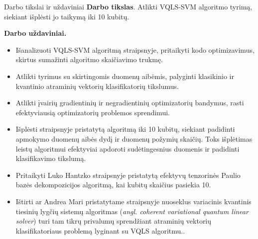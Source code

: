 \begin{frame}{Darbo tikslai ir uždaviniai}
    \textbf{Darbo tikslas}. Atlikti VQLS-SVM algoritmo tyrimą, siekiant išplėsti jo taikymą iki 10 kubitų.

    \textbf{Darbo uždaviniai.}
    \begin{itemize}
         \item Išanalizuoti VQLS-SVM algoritmą \cite{VQLS-SVM} straipsnyje, pritaikyti kodo optimizavimus, skirtus sumažinti algoritmo skaičiavimo trukmę.
    \item Atlikti tyrimus su skirtingomis duomenų aibėmis, palyginti klasikinio ir kvantinio atraminių vektorių klasifikatorių tikslumus.
    \item Atlikti įvairių gradientinių ir negradientinių optimizatorių bandymus, rasti efektyviausią optimizatorių problemos sprendimui.
    \item Išplėsti \cite{VQLS-SVM} straipsnyje pristatytą algoritmą iki 10 kubitų, siekiant padidinti apmokymo duomenų aibės dydį ir duomenų požymių skaičių. Toks išplėtimas leistų algoritmui efektyviai apdoroti sudėtingesnius duomenis ir padidinti klasifikavimo tikslumą.
    \item Pritaikyti Luko Hantzko straipsnyje \cite{TensorPauliDecomposition} pristatytą efektyvų tenzorinės Paulio bazės dekompozicijos algoritmą, kai kubitų skaičius pasiekia 10. 
    \item Ištirti ar Andrea Mari pristatytame straipsnyje nuoseklus variacinis kvantinis tiesinių lygčių sistemų algoritmas (\emph{angl. coherent variational quantum linear solver}) turi tam tikrų privalumų sprendžiant atraminių vektorių klasifikatoriaus problemą lyginant su VQLS algoritmu.\cite{CVQLS, VQLS}.
    \end{itemize}
\end{frame}
